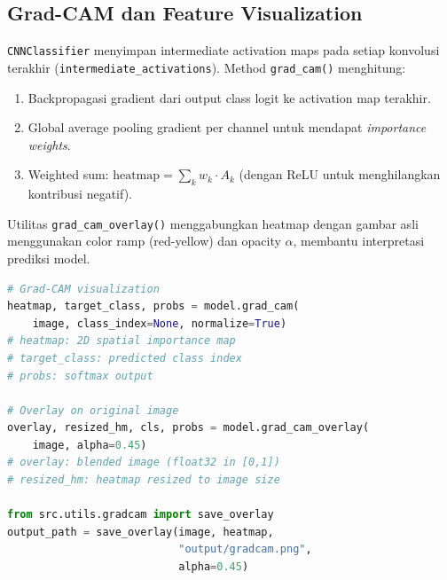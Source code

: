 \subsection{Grad-CAM dan Feature Visualization}
\texttt{CNNClassifier} menyimpan intermediate activation maps pada setiap konvolusi terakhir (\texttt{intermediate\_activations}). Method \texttt{grad\_cam()} menghitung:
\begin{enumerate}
    \item Backpropagasi gradient dari output class logit ke activation map terakhir.
    \item Global average pooling gradient per channel untuk mendapat \textit{importance weights}.
    \item Weighted sum: $\text{heatmap} = \sum_k w_k \cdot A_k$ (dengan ReLU untuk menghilangkan kontribusi negatif).
\end{enumerate}
Utilitas \texttt{grad\_cam\_overlay()} menggabungkan heatmap dengan gambar asli menggunakan color ramp (red-yellow) dan opacity $\alpha$, membantu interpretasi prediksi model.

\begin{lstlisting}[language=Python, basicstyle=\ttfamily\small]
# Grad-CAM visualization
heatmap, target_class, probs = model.grad_cam(
    image, class_index=None, normalize=True)
# heatmap: 2D spatial importance map
# target_class: predicted class index
# probs: softmax output

# Overlay on original image
overlay, resized_hm, cls, probs = model.grad_cam_overlay(
    image, alpha=0.45)
# overlay: blended image (float32 in [0,1])
# resized_hm: heatmap resized to image size

from src.utils.gradcam import save_overlay
output_path = save_overlay(image, heatmap, 
                           "output/gradcam.png", 
                           alpha=0.45)
\end{lstlisting}

